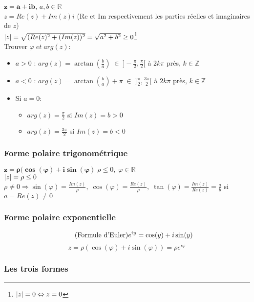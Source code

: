 \documentclass[10pt,a4paper]{book}
\newcommand{\R}{\mathbb{R}}
\newcommand{\Z}{\mathbb{Z}}
\DeclarePairedDelimiter\abs{\lvert}{\rvert}
\begin{document}
$\mathbf{z=a+ib}$, $a,b\in \R$ \\
$z = Re(z) + Im(z)i$ (Re et Im respectivement les parties réelles et imaginaires de $z$) \\
$\abs{z}= \sqrt{(Re(z)^2 + (Im(z))^2} = \sqrt{a^2 + b^2} \geq 0$\footnote{$\abs{z} = 0 \Leftrightarrow z = 0$} \\
Trouver $\varphi \; et\; arg(z)$:
\begin{itemize}
\item  $a>0$ : $arg(z) = \arctan(\frac{b}{a})\; \in \; ]-\frac{\pi}{2}, \frac{\pi}{2}[$ à $2k\pi$ près, $k\in \Z$
\item  $a<0$ : $arg(z) = \arctan(\frac{b}{a})+\pi \; \in \; ]\frac{\pi}{2}, \frac{3\pi}{2}[$ à $2k\pi$ près, $k\in \Z$
\item Si $a=0$:
\begin{itemize}
\item $arg(z) = \frac{\pi}{2}$ si $Im(z)=b > 0$
\item $arg(z) = \frac{3\pi}{2}$ si $Im(z)=b < 0$
\end{itemize}
\end{itemize}

\subsubsection{Forme polaire trigonométrique}

$\mathbf{z = \rho (\cos(\varphi) + i\sin(\varphi)} \; \rho \leq 0, \; \varphi \in \R$ \\
$\abs{z} = \rho \leq 0$
$\rho \neq 0 \Rightarrow \sin(\varphi) = \frac{Im(z)}{\rho}, \; \cos(\varphi) = \frac{Re(z)}{\rho}, \; \tan(\varphi) = \frac{Im(z)}{Re(z)} = \frac{a}{b}$ si $a = Re(z)\neq 0$

\subsubsection{Forme polaire exponentielle}

\begin{equation} \tag{Formule d'Euler}
e^{iy} = \cos(y) + i\sin(y) \\
\end{equation}
\begin{equation*}
z = \rho(\cos(\varphi) + i\sin(\varphi)) = \rho e^{i\varphi}
\end{equation*}

\subsubsection{Les trois formes}
\end{document}
